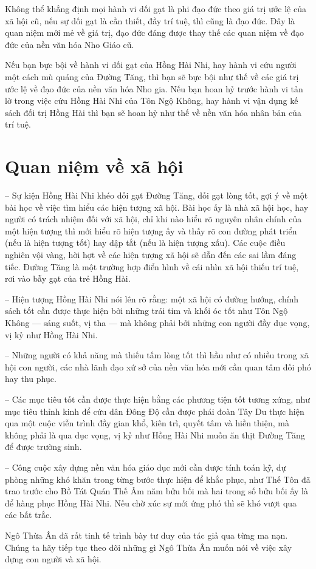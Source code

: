Không thể khẳng định mọi hành vi dối gạt là phi đạo đức theo giá trị ước lệ của xã hội cũ, nếu sự dối gạt là cần thiết, đầy trí tuệ, thì cũng là đạo đức. Đây là quan niệm mới mẻ về giá trị, đạo đức đáng được thay thế các quan niệm về đạo đức của nền văn hóa Nho Giáo cũ.

Nếu bạn bực bội về hành vi dối gạt của Hồng Hài Nhi, hay hành vi cứu người một cách mù quáng của Đường Tăng, thì bạn sẽ bực bội như thế về các giá trị ước lệ về đạo đức của nền văn hóa Nho gia. Nếu bạn hoan hỷ trước hành vi tản lờ trong việc cứu Hồng Hài Nhi của Tôn Ngộ Không, hay hành vi vận dụng kế sách đối trị Hồng Hài thì bạn sẽ hoan hỷ như thế về nền văn hóa nhân bản của trí tuệ.

\section{Quan niệm về xã hội} %
\label{sec:40_41_xa_hoi}

-- Sự kiện Hồng Hài Nhi khéo dối gạt Đường Tăng, dối gạt lòng tốt, gợi ý về một bài học về việc tìm hiểu các hiện tượng xã hội. Bài học ấy là nhà xã hội học, hay người có trách nhiệm đối với xã hội, chỉ khi nào hiểu rõ nguyên nhân chính của một hiện tượng thì mới hiểu rõ hiện tượng ấy và thấy rõ con đường phát triển (nếu là hiện tượng tốt) hay dập tắt (nếu là hiện tượng xấu). Các cuộc điều nghiên vội vàng, hời hợt về các hiện tượng xã hội sẽ dẫn đến các sai lầm đáng tiếc. Đường Tăng là một trường hợp điển hình về cái nhìn xã hội thiếu trí tuệ, rơi vào bẫy gạt của trẻ Hồng Hài.

-- Hiện tượng Hồng Hài Nhi nói lên rõ rằng: một xã hội có đường hướng, chính sách tốt cần được thực hiện bởi những trái tim và khối óc tốt như Tôn Ngộ Không --- sáng suốt, vị tha --- mà không phải bởi những con người đầy dục vọng, vị kỷ như Hồng Hài Nhi.

-- Những người có khả năng mà thiếu tấm lòng tốt thì hầu như có nhiều trong xã hội con người, các nhà lãnh đạo xứ sở của nền văn hóa mới cần quan tâm đối phó hay thu phục.

-- Các mục tiêu tốt cần được thực hiện bằng các phương tiện tốt tương xứng, như mục tiêu thỉnh kinh để cứu dân Đông Độ cần được phái đoàn Tây Du thực hiện qua một cuộc viễn trình đầy gian khổ, kiên trì, quyết tâm và hiền thiện, mà không phải là qua dục vọng, vị kỷ như Hồng Hài Nhi muốn ăn thịt Đường Tăng để được trường sinh.

-- Công cuộc xây dựng nền văn hóa giáo dục mới cần được tính toán kỹ, dự phòng những khó khăn trong từng bước thực hiện để khắc phục, như Thế Tôn đã trao trước cho Bồ Tát Quán Thế Âm năm bửu bối mà hai trong số bửu bối ấy là để hàng phục Hồng Hài Nhi. Nếu chờ xúc sự mới ứng phó thì sẽ khó vượt qua các bất trắc.

Ngô Thừa Ân đã rất tinh tế trình bày tư duy của tác giả qua từng ma nạn. Chúng ta hãy tiếp tục theo dõi những gì Ngô Thừa Ân muốn nói về việc xây dựng con người và xã hội.
